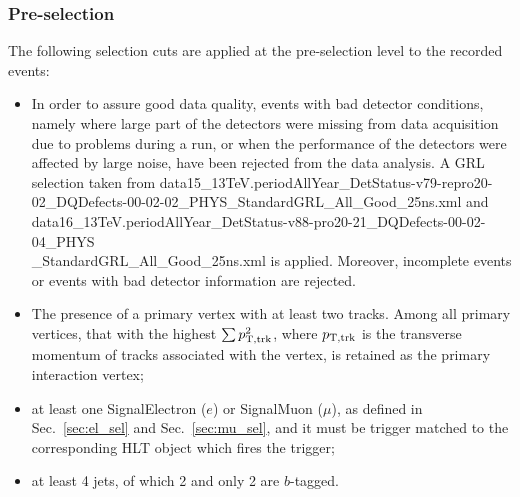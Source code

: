 \subsubsection{Pre-selection}
The following selection cuts are applied at the pre-selection level to the recorded events:
\begin{itemize}
\item In order to assure good data quality, events with bad detector
  conditions, namely where large part of the detectors were missing
  from data acquisition due to problems during a run, or when the
  performance of the detectors were affected by large noise, have been
  rejected from the data analysis. A GRL selection taken from
  data15\_13TeV.periodAllYear\_DetStatus-v79-repro20-02\_DQDefects-00-02-02\_PHYS\_StandardGRL\_All\_Good\_25ns.xml
  and data16\_13TeV.periodAllYear\_DetStatus-v88-pro20-21\_DQDefects-00-02-04\_PHYS \\ \_StandardGRL\_All\_Good\_25ns.xml
  is applied. Moreover, incomplete events or events with bad detector information are rejected. 

\item The presence of a  primary vertex with at least two
  tracks. Among all primary vertices, that with the highest
	$\sum p_{{\rm T,trk}}^{2}$, where
	$p_{{\rm T,trk}}$ is the transverse momentum of tracks
	associated with the vertex, is retained as the primary
  interaction vertex;
\item at least one SignalElectron ($e$) or SignalMuon ($\mu$), as defined in Sec.~\ref{sec:el_sel} and Sec.~\ref{sec:mu_sel}, and it must be trigger matched to the 
corresponding HLT object which fires the trigger;
\item at least 4 jets, of which 2 and only 2 are $b$-tagged.
\end{itemize}

